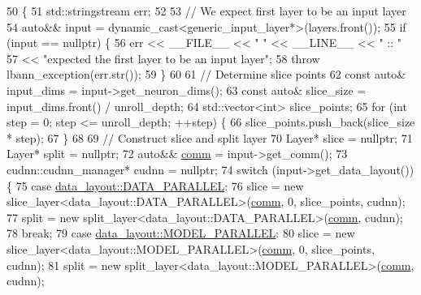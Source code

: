 \begin{DoxyCode}
50                                                                                 \{
51     std::stringstream err;
52 
53   \textcolor{comment}{// We expect first layer to be an input layer}
54   \textcolor{keyword}{auto}&& input = \textcolor{keyword}{dynamic\_cast<}generic\_input\_layer*\textcolor{keyword}{>}(layers.front());
55   \textcolor{keywordflow}{if} (input == \textcolor{keyword}{nullptr}) \{
56     err << \_\_FILE\_\_ << \textcolor{stringliteral}{" "} << \_\_LINE\_\_ << \textcolor{stringliteral}{" :: "}
57         << \textcolor{stringliteral}{"expected the first layer to be an input layer"};
58     \textcolor{keywordflow}{throw} lbann\_exception(err.str());
59   \}
60   
61   \textcolor{comment}{// Determine slice points}
62   \textcolor{keyword}{const} \textcolor{keyword}{auto}& input\_dims = input->get\_neuron\_dims();
63   \textcolor{keyword}{const} \textcolor{keyword}{auto}& slice\_size = input\_dims.front() / unroll\_depth;
64   std::vector<int> slice\_points;
65   \textcolor{keywordflow}{for} (\textcolor{keywordtype}{int} step = 0; step <= unroll\_depth; ++step) \{
66     slice\_points.push\_back(slice\_size * step);
67   \}
68 
69   \textcolor{comment}{// Construct slice and split layer}
70   Layer* slice = \textcolor{keyword}{nullptr};
71   Layer* split = \textcolor{keyword}{nullptr};
72   \textcolor{keyword}{auto}&& \hyperlink{file__io_8cpp_ab048c6f9fcbcfaa57ce68b00263dbebe}{comm} = input->get\_comm();
73   cudnn::cudnn\_manager* cudnn = \textcolor{keyword}{nullptr};
74   \textcolor{keywordflow}{switch} (input->get\_data\_layout()) \{
75   \textcolor{keywordflow}{case} \hyperlink{base_8hpp_a786677cbfb3f5677b4d84f3056eb08dba37d2a3465f7cbf4ab60f4e79944d0638}{data\_layout::DATA\_PARALLEL}:
76     slice = \textcolor{keyword}{new} slice\_layer<data\_layout::DATA\_PARALLEL>(\hyperlink{file__io_8cpp_ab048c6f9fcbcfaa57ce68b00263dbebe}{comm}, 0, slice\_points, cudnn);
77     split = \textcolor{keyword}{new} split\_layer<data\_layout::DATA\_PARALLEL>(\hyperlink{file__io_8cpp_ab048c6f9fcbcfaa57ce68b00263dbebe}{comm}, cudnn);
78     \textcolor{keywordflow}{break};
79   \textcolor{keywordflow}{case} \hyperlink{base_8hpp_a786677cbfb3f5677b4d84f3056eb08dbac94d7b0e44ab8bdcdad694a673cdeae0}{data\_layout::MODEL\_PARALLEL}:
80     slice = \textcolor{keyword}{new} slice\_layer<data\_layout::MODEL\_PARALLEL>(\hyperlink{file__io_8cpp_ab048c6f9fcbcfaa57ce68b00263dbebe}{comm}, 0, slice\_points, cudnn);
81     split = \textcolor{keyword}{new} split\_layer<data\_layout::MODEL\_PARALLEL>(\hyperlink{file__io_8cpp_ab048c6f9fcbcfaa57ce68b00263dbebe}{comm}, cudnn);

\end{DoxyCode}
